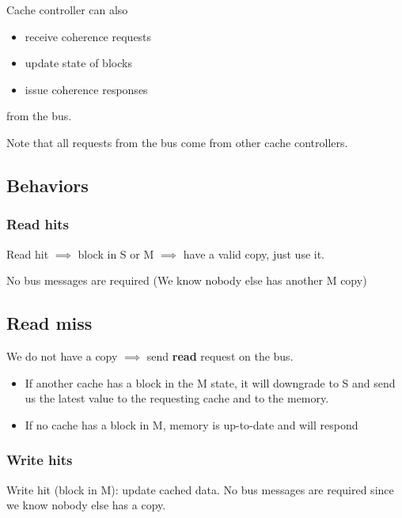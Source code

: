 \documentclass[letterpaper,12pt]{article}
\begin{document}
Cache controller can also\begin{itemize}
    \item receive coherence requests
    \item update state of blocks
    \item issue coherence responses
\end{itemize}
from the bus. 

Note that all requests from the bus come from other cache controllers.

\subsection{Behaviors}
\subsubsection{Read hits}
Read hit $\implies$ block in S or M $\implies$ have a valid copy, just use it.

No bus messages are required (We know nobody else has another M copy)
\subsection{Read miss}
We do not have a copy $\implies$ send \textbf{read} request on the bus. \begin{itemize}
    \item If another cache has a block in the M state, it will downgrade to S and send us the latest value to the requesting cache and to the memory.
    \item If no cache has a block in M, memory is up-to-date and will respond
\end{itemize}
\subsubsection{Write hits}
Write hit (block in M): update cached data. No bus messages are required since we know nobody else has a copy.
\end{document}
